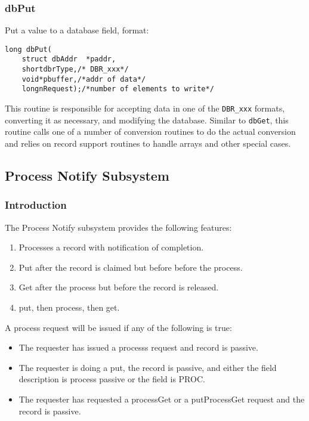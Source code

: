 \subsubsection{dbPut}

Put a value to a database field, format:

\begin{verbatim}
long dbPut(
    struct dbAddr  *paddr,
    shortdbrType,/* DBR_xxx*/
    void*pbuffer,/*addr of data*/
    longnRequest);/*number of elements to write*/
\end{verbatim}

This routine is responsible for accepting data in one of the \verb|DBR_xxx| formats, converting it as necessary, and modifying 
the database.
Similar to \verb|dbGet|, this routine calls one of a number of conversion routines to do the actual conversion and relies on record support routines to handle arrays and other special cases.

\label{Process Notify Subsystem}
\subsection{Process Notify Subsystem}

\subsubsection{Introduction}

The Process Notify subsystem provides the following features:

\begin{enumerate}

\item Processes a record with notification of completion.

\item Put after the record is claimed but before before the process.

\item Get after the process but before the record is released.

\item put, then process, then get.

\end{enumerate}

A process request will be issued if any of the following is true:

\begin{itemize}

\item The requester has issued a processs request and record is passive.

\item The requester is doing a put, the record is passive, and either the field description is process passive or the field is PROC.

\item The requester has requested a processGet or a putProcessGet request and the record is passive.

\end{itemize}

